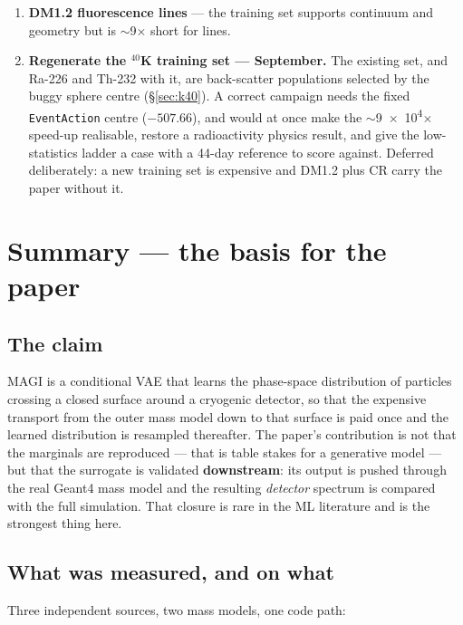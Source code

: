 \documentclass[11pt,a4paper]{article}
\begin{document}
\begin{enumerate}[nosep]
        recycling --- the warning path in \texttt{PrimaryGeneratorAction.cc} is
        unreachable. Silent recycling is exactly what it exists to catch.
  \item \textbf{DM1.2 fluorescence lines} --- the training set supports
        continuum and geometry but is $\sim$9$\times$ short for lines.
  \item \textbf{Regenerate the $^{40}$K training set --- September.} The
        existing set, and Ra-226 and Th-232 with it, are back-scatter
        populations selected by the buggy sphere centre (\S\ref{sec:k40}).
        A correct campaign needs the fixed \texttt{EventAction} centre
        ($-507.66$), and would at once make the $\sim$\num{9e4}$\times$ speed-up
        realisable, restore a radioactivity physics result, and give the
        low-statistics ladder a case with a 44-day reference to score against.
        Deferred deliberately: a new training set is expensive and DM1.2 plus CR
        carry the paper without it.
\end{enumerate}


\section{Summary --- the basis for the paper}
\label{sec:summary}

\subsection*{The claim}

MAGI is a conditional VAE that learns the phase-space distribution of particles
crossing a closed surface around a cryogenic detector, so that the expensive
transport from the outer mass model down to that surface is paid once and the
learned distribution is resampled thereafter. The paper's contribution is not
that the marginals are reproduced --- that is table stakes for a generative
model --- but that the surrogate is validated \textbf{downstream}: its output is
pushed through the real Geant4 mass model and the resulting \emph{detector}
spectrum is compared with the full simulation. That closure is rare in the ML
literature and is the strongest thing here.

\subsection*{What was measured, and on what}

Three independent sources, two mass models, one code path:
\end{document}
